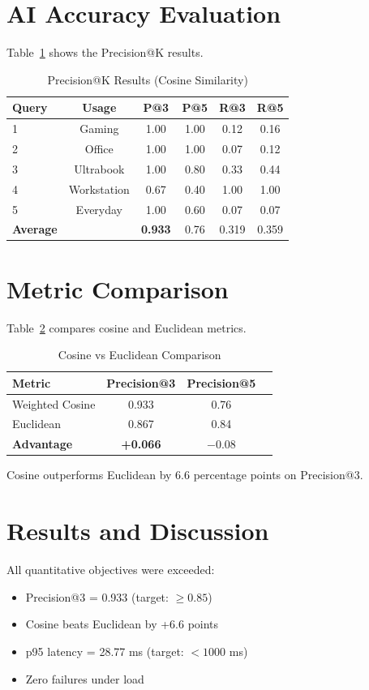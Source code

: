 \section{AI Accuracy Evaluation}
Table~\ref{tab:precision} shows the Precision@K results.

\begin{table}[htbp]
  \centering
  \caption{Precision@K Results (Cosine Similarity)}
  \label{tab:precision}
  \begin{tabular}{@{}lccccc@{}}
    \toprule
    \textbf{Query} & \textbf{Usage} & \textbf{P@3} & \textbf{P@5} & \textbf{R@3} & \textbf{R@5} \\
    \midrule
    1 & Gaming      & 1.00 & 1.00 & 0.12 & 0.16 \\
    2 & Office      & 1.00 & 1.00 & 0.07 & 0.12 \\
    3 & Ultrabook   & 1.00 & 0.80 & 0.33 & 0.44 \\
    4 & Workstation & 0.67 & 0.40 & 1.00 & 1.00 \\
    5 & Everyday    & 1.00 & 0.60 & 0.07 & 0.07 \\
    \midrule
    \textbf{Average} & & \textbf{0.933} & 0.76 & 0.319 & 0.359 \\
    \bottomrule
  \end{tabular}
\end{table}

\section{Metric Comparison}
Table~\ref{tab:comparison} compares cosine and Euclidean metrics.

\begin{table}[htbp]
  \centering
  \caption{Cosine vs Euclidean Comparison}
  \label{tab:comparison}
  \begin{tabular}{@{}lccc@{}}
    \toprule
    \textbf{Metric} & \textbf{Precision@3} & \textbf{Precision@5} \\
    \midrule
    Weighted Cosine   & 0.933 & 0.76 \\
    Euclidean         & 0.867 & 0.84 \\
    \textbf{Advantage} & \textbf{+0.066} & $-0.08$ \\
    \bottomrule
  \end{tabular}
\end{table}

Cosine outperforms Euclidean by 6.6 percentage points on Precision@3.

\section{Results and Discussion}
All quantitative objectives were exceeded:
\begin{itemize}
  \item Precision@3 = 0.933 (target: $\geq 0.85$)
  \item Cosine beats Euclidean by +6.6 points
  \item p95 latency = 28.77 ms (target: $< 1000$ ms)
  \item Zero failures under load
\end{itemize}
